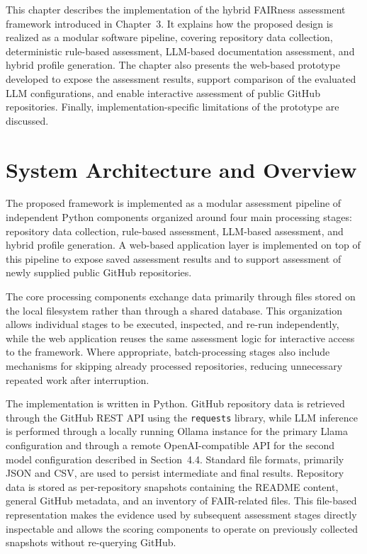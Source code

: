This chapter describes the implementation of the hybrid FAIRness
assessment framework introduced in Chapter~3. It explains how the
proposed design is realized as a modular software pipeline, covering
repository data collection, deterministic rule-based assessment,
LLM-based documentation assessment, and hybrid profile generation.
The chapter also presents the web-based prototype developed to expose
the assessment results, support comparison of the evaluated LLM
configurations, and enable interactive assessment of public GitHub
repositories. Finally, implementation-specific limitations of the
prototype are discussed.

\section{System Architecture and Overview}

The proposed framework is implemented as a modular assessment pipeline
of independent Python components organized around four main processing
stages: repository data collection, rule-based assessment, LLM-based
assessment, and hybrid profile generation. A web-based application
layer is implemented on top of this pipeline to expose saved assessment
results and to support assessment of newly supplied public GitHub
repositories.

The core processing components exchange data primarily through files
stored on the local filesystem rather than through a shared database.
This organization allows individual stages to be executed, inspected,
and re-run independently, while the web application reuses the same
assessment logic for interactive access to the framework. Where
appropriate, batch-processing stages also include mechanisms for
skipping already processed repositories, reducing unnecessary repeated
work after interruption.

The implementation is written in Python. GitHub repository data is retrieved 
through the GitHub REST API using the \texttt{requests} library, while LLM 
inference is performed through a locally running Ollama instance for the primary 
Llama configuration and through a remote OpenAI-compatible API for the second model 
configuration described in Section~4.4. Standard file formats, primarily JSON and CSV, 
are used to persist intermediate and final results. Repository data is
stored as per-repository snapshots containing the README content,
general GitHub metadata, and an inventory of FAIR-related files.
This file-based representation makes the evidence used by subsequent
assessment stages directly inspectable and allows the scoring
components to operate on previously collected snapshots without
re-querying GitHub.

